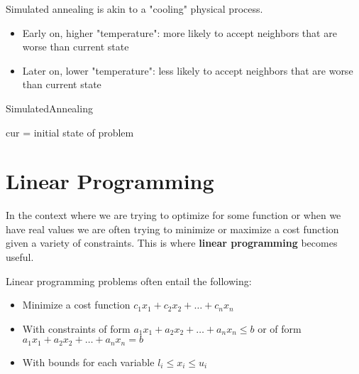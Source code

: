 \begin{definition}
	Simulated annealing is akin to a "cooling" physical process.
	\begin{itemize}
		\item Early on, higher "temperature": more likely to accept neighbors that are worse than current state
		\item Later on, lower "temperature": less likely to accept neighbors that are worse than current state
	\end{itemize}
\end{definition}

\begin{algorithm}[H]
	\DontPrintSemicolon
	\caption{SimulatedAnnealing}
	cur = initial state of problem \\
\end{algorithm}

\section{Linear Programming}
In the context where we are trying to optimize for some function or when we have real values we are often trying to minimize or maximize a cost function given a variety of constraints. This is where \textbf{linear programming} becomes useful.

\begin{definition}
	Linear programming problems often entail the following:
	\begin{itemize}
		\item Minimize a cost function \(c_1 x_1 + c_2 x_2 + \ldots + c_n x_n\)
		\item With constraints of form \(a_1 x_1 + a_2 x_2 + \ldots + a_n x_n \leq b\) or of form \(a_1 x_1 + a_2 x_2 + \ldots + a_n x_n = b\)
		\item With bounds for each variable \(l_i \leq x_i \leq u_i\) 
	\end{itemize}
\end{definition}

